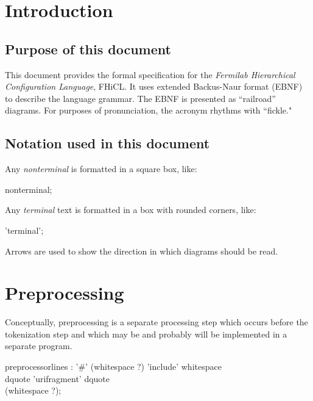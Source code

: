 \documentclass[twoside]{memarticle}
\begin{document}
\topmatter
\chapter{Introduction}

\section{Purpose of this document}
This document provides the formal specification
for the \emph{Fermilab Hierarchical Configuration Language},
FHiCL.
It uses extended Backus-Naur format (EBNF) to describe the language grammar.
The EBNF is presented as ``railroad'' diagrams.
For purposes of pronunciation, the acronym rhythms with ``fickle."

\section{Notation used in this document}

Any \emph{nonterminal} is formatted in a square box, like:
\begin{rail}
  nonterminal;
\end{rail}

Any \emph{terminal} text is formatted in a box with rounded corners, like:
\begin{rail}
  'terminal';
\end{rail}


Arrows are used to show the direction in which diagrams should be read.

\chapter{Preprocessing}

Conceptually, preprocessing is a separate processing step which occurs
before the tokenization step and which may be and probably will be
implemented in a separate program.

\begin{rail}
preprocessorlines : '\#' (whitespace ?) 'include' whitespace
                    \\ dquote 'urifragment' dquote
                    \\ (whitespace ?);
\end{rail}
\end{document}
